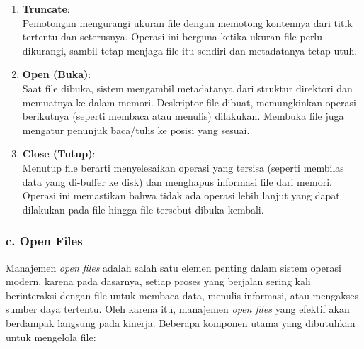 \documentclass[12pt]{article}
\begin{document}
\begin{enumerate}
    \item \textbf{Truncate}: \\
    Pemotongan mengurangi ukuran file dengan memotong kontennya dari titik tertentu dan seterusnya. Operasi ini berguna ketika ukuran file perlu dikurangi, sambil tetap menjaga file itu sendiri dan metadatanya tetap utuh.
    
    \item \textbf{Open (Buka)}: \\
    Saat file dibuka, sistem mengambil metadatanya dari struktur direktori dan memuatnya ke dalam memori. Deskriptor file dibuat, memungkinkan operasi berikutnya (seperti membaca atau menulis) dilakukan. Membuka file juga mengatur penunjuk baca/tulis ke posisi yang sesuai.
    
    \item \textbf{Close (Tutup)}: \\
    Menutup file berarti menyelesaikan operasi yang tersisa (seperti membilas data yang di-buffer ke disk) dan menghapus informasi file dari memori. Operasi ini memastikan bahwa tidak ada operasi lebih lanjut yang dapat dilakukan pada file hingga file tersebut dibuka kembali.
\end{enumerate}
\subsubsection*{c. Open Files}



Manajemen \textit{open files} adalah salah satu elemen penting dalam sistem operasi modern, karena pada dasarnya, setiap proses yang berjalan sering kali berinteraksi dengan file untuk membaca data, menulis informasi, atau mengakses sumber daya tertentu. Oleh karena itu, manajemen \textit{open files} yang efektif akan berdampak langsung pada kinerja. Beberapa komponen utama yang dibutuhkan untuk mengelola file:
\end{document}
